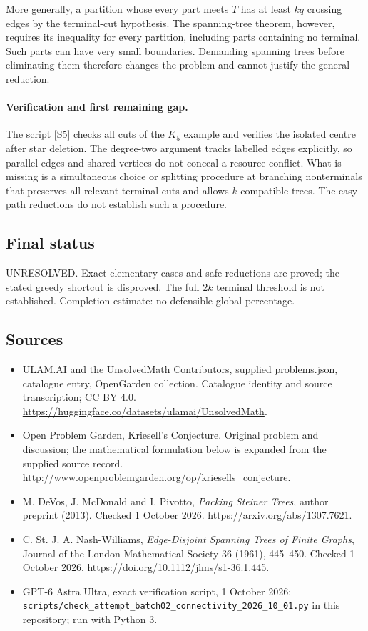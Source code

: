 \documentclass[11pt,a4paper]{article}
\begin{document}
More generally, a partition whose every part meets $T$ has at least
$kq$ crossing edges by the terminal-cut hypothesis. The spanning-tree
theorem, however, requires its inequality for every partition,
including parts containing no terminal. Such parts can have very small
boundaries. Demanding spanning trees before eliminating them therefore
changes the problem and cannot justify the general reduction.

\paragraph{Verification and first remaining gap.}
The script [S5] checks all cuts of the $K_5$ example and verifies the
isolated centre after star deletion. The degree-two argument tracks
labelled edges explicitly, so parallel edges and shared vertices do
not conceal a resource conflict. What is missing is a simultaneous
choice or splitting procedure at branching nonterminals that preserves
all relevant terminal cuts and allows $k$ compatible trees. The easy
path reductions do not establish such a procedure.

\subsection{Final status}
UNRESOLVED. Exact elementary cases and safe reductions are proved;
the stated greedy shortcut is disproved. The full $2k$ terminal
threshold is not established. Completion estimate: no defensible global
percentage.

\subsection{Sources}
\begin{itemize}
\item[S1] ULAM.AI and the UnsolvedMath Contributors, supplied problems.json, catalogue entry, OpenGarden collection. Catalogue identity and source transcription; CC BY 4.0.
\url{https://huggingface.co/datasets/ulamai/UnsolvedMath}.
\item[S2] Open Problem Garden, Kriesell's Conjecture. Original problem and discussion; the mathematical formulation below is expanded from the supplied source record.
\url{http://www.openproblemgarden.org/op/kriesells_conjecture}.
\item[S3] M. DeVos, J. McDonald and I. Pivotto, \emph{Packing Steiner Trees}, author preprint (2013). Checked 1 October 2026.
\url{https://arxiv.org/abs/1307.7621}.
\item[S4] C. St. J. A. Nash-Williams, \emph{Edge-Disjoint Spanning Trees of Finite Graphs}, Journal of the London Mathematical Society 36 (1961), 445--450. Checked 1 October 2026.
\url{https://doi.org/10.1112/jlms/s1-36.1.445}.
\item[S5] GPT-6 Astra Ultra, exact verification script, 1 October 2026: \texttt{scripts/check\_attempt\_batch02\_connectivity\_2026\_10\_01.py} in this repository; run with Python 3.
\end{itemize}
\end{document}
